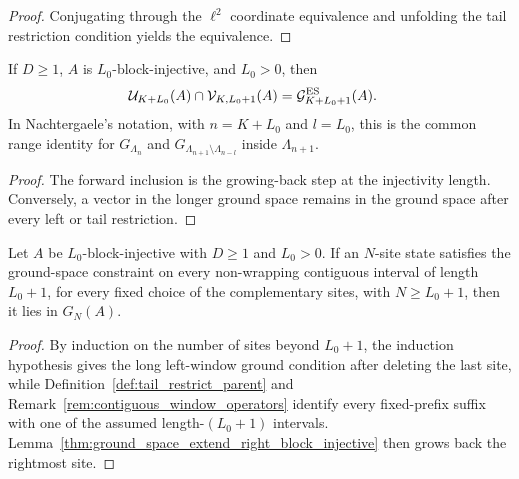 \begin{proof}
    \leanok
    Conjugating through the $\ell^2$ coordinate equivalence and unfolding the
    tail restriction condition yields the equivalence.
\end{proof}

\begin{lemma}
    \label{thm:open_chain_left_tail_ground_intersection}
    \leanok
    If $D\ge1$, $A$ is $L_0$-block-injective, and $L_0>0$, then
    \begin{align}
        \mathcal U_{K+L_0}(A)\cap\mathcal V_{K,L_0+1}(A)
         & =\mathcal G_{K+L_0+1}^{\mathrm{ES}}(A). \notag
    \end{align}
    In Nachtergaele's notation, with $n=K+L_0$ and $l=L_0$, this is the
    common range identity for $G_{\Lambda_n}$ and
    $G_{\Lambda_{n+1}\setminus\Lambda_{n-l}}$ inside $\Lambda_{n+1}$.
\end{lemma}

\begin{proof}
    \leanok
    The forward inclusion is the growing-back step at the injectivity length.
    Conversely, a vector in the longer ground space remains in the ground
    space after every left or tail restriction.
\end{proof}

\begin{lemma}%
    \label{thm:normal_open_chain_range_reduction}
    \leanok
    Let $A$ be $L_0$-block-injective with $D \ge 1$ and $L_0 > 0$.
    If an $N$-site state satisfies the ground-space constraint on every
    non-wrapping contiguous interval of length $L_0+1$, for every fixed choice
    of the complementary sites, with $N \ge L_0+1$, then it lies in $G_N(A)$.
\end{lemma}

\begin{proof}
    \leanok
    By induction on the number of sites beyond $L_0+1$, the induction
    hypothesis gives the long left-window ground condition after deleting the
    last site, while Definition~\ref{def:tail_restrict_parent} and
    Remark~\ref{rem:contiguous_window_operators} identify every fixed-prefix
    suffix with one of the assumed length-$(L_0+1)$ intervals.
    Lemma~\ref{thm:ground_space_extend_right_block_injective} then grows back
    the rightmost site.
\end{proof}

